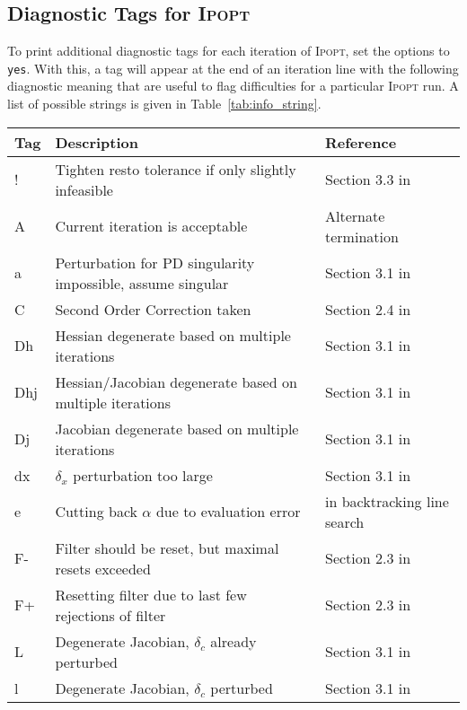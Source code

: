 \documentclass[10pt]{article}
\newcommand{\Ipopt}{\textsc{Ipopt}\xspace}
\begin{document}
\subsection{Diagnostic Tags for \Ipopt}

To print additional diagnostic tags for each iteration of \Ipopt, set
the options 
to \texttt{yes}. With
this, a tag will appear at the end of an iteration line with the
following diagnostic meaning that are useful to flag difficulties for
a particular \Ipopt run.  A list of possible strings is given in
Table~\ref{tab:info_string}.

\begin{table}\centering
  \begin{tabular}{@{}lll@{}}
    Tag & Description & Reference \\
    \hline 
    ! & Tighten resto tolerance if only slightly infeasible & Section 3.3 in \cite{WaecBieg06:mp} \\ 
    A & Current iteration is acceptable & Alternate termination \\  
    a & Perturbation for PD singularity impossible, assume singular & Section 3.1 in \cite{WaecBieg06:mp}\\  
    C & Second Order Correction taken & Section 2.4 in \cite{WaecBieg06:mp} \\  
    Dh & Hessian degenerate based on multiple iterations & Section 3.1 in \cite{WaecBieg06:mp}\\  
    Dhj & Hessian/Jacobian degenerate based on multiple iterations & Section 3.1 in \cite{WaecBieg06:mp}\\  
    Dj & Jacobian degenerate based on multiple iterations & Section 3.1 in \cite{WaecBieg06:mp}\\  
    dx & $\delta_x$ perturbation too large & Section 3.1 in \cite{WaecBieg06:mp}\\  
    e & Cutting back $\alpha$ due to evaluation error & in backtracking line search \\  
    F- & Filter should be reset, but maximal resets exceeded & Section 2.3 in \cite{WaecBieg06:mp} \\  
    F+ & Resetting filter due to last few rejections of filter & Section 2.3 in \cite{WaecBieg06:mp} \\  
    L & Degenerate Jacobian, $\delta_c$ already perturbed & Section 3.1 in \cite{WaecBieg06:mp}\\  
    l & Degenerate Jacobian, $\delta_c$ perturbed & Section 3.1 in \cite{WaecBieg06:mp}\\  

\end{tabular}
\end{table}
\end{document}
